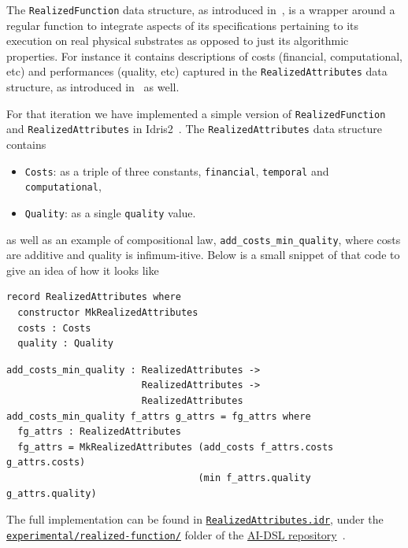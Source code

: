 \documentclass[]{report}
\begin{document}
The \texttt{RealizedFunction} data structure, as introduced
in~\cite{GoertzelGeisweillerBlog}, is a wrapper around a regular
function to integrate aspects of its specifications pertaining to its
execution on real physical substrates as opposed to just its
algorithmic properties.  For instance it contains descriptions of
costs (financial, computational, etc) and performances (quality, etc)
captured in the \texttt{RealizedAttributes} data structure, as
introduced in~\cite{GoertzelGeisweillerBlog} as well.

For that iteration we have implemented a simple version of
\texttt{RealizedFunction} and \texttt{RealizedAttributes} in
Idris2~\cite{Idris}.  The \texttt{RealizedAttributes} data structure
contains
\begin{itemize}
\item \texttt{Costs}: as a triple of three constants,
  \texttt{financial}, \texttt{temporal} and \texttt{computational},
\item \texttt{Quality}: as a single \texttt{quality} value.
\end{itemize}
as well as an example of compositional law,
\texttt{add\_costs\_min\_quality}, where costs are additive and
quality is infimum-itive.  Below is a small snippet of that code to
give an idea of how it looks like

\begin{verbatim}
record RealizedAttributes where
  constructor MkRealizedAttributes
  costs : Costs
  quality : Quality
\end{verbatim}

\begin{verbatim}
add_costs_min_quality : RealizedAttributes ->
                        RealizedAttributes ->
                        RealizedAttributes
add_costs_min_quality f_attrs g_attrs = fg_attrs where
  fg_attrs : RealizedAttributes
  fg_attrs = MkRealizedAttributes (add_costs f_attrs.costs g_attrs.costs)
                                  (min f_attrs.quality g_attrs.quality)
\end{verbatim}
The full implementation can be found in
\href{https://github.com/singnet/ai-dsl/blob/master/experimental/realized-function/RealizedAttributes.idr}{\texttt{RealizedAttributes.idr}},
under the
\href{https://github.com/singnet/ai-dsl/blob/master/experimental/realized-function/}{\texttt{experimental/realized-function/}}
folder of the \href{https://github.com/singnet/ai-dsl/}{AI-DSL
  repository}~\cite{AIDSLRepo}.\\
\end{document}
